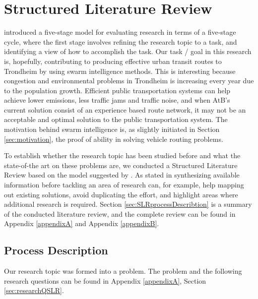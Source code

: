 \section{Structured Literature Review}
\label{sec:structuredLiteratureReview}

\citet{cohen88} introduced a five-stage model for evaluating research in terms of a five-stage cycle, where the first stage involves refining the research topic to a task, and identifying a view of how to accomplish the task. Our task / goal in this research is, hopefully, contributing to producing effective urban transit routes to Trondheim by using swarm intelligence methods. This is interesting because congestion and environmental problems in Trondheim is increasing every year due to the population growth\citep{website:miljopakken}. Efficient public transportation systems can help achieve lower emissions, less traffic jams and traffic noise, and when AtB's\citet{website:atb} current solution consist of an experience based route network, it may not be an acceptable and optimal solution to the public transportation system. The motivation behind swarm intelligence is, as slightly initiated in Section \vref{sec:motivation}, the proof of ability in solving vehicle routing problems. 

To establish whether the research topic has been studied before and what the state-of-the art on these problems are, we conducted a Structured Literature Review based on the model suggested by \citet{kofod2014}. As stated in \citep{kofod2014} synthesizing available information before tackling an area of research can, for example, help mapping out existing solutions, avoid duplicating the effort, and highlight areas where additional research is required. Section \vref{sec:SLRprocessDescribtion} is a summary of the conducted literature review, and the complete review can be found in Appendix \vref{appendixA} and Appendix \vref{appendixB}. 


\subsection{Process Description}
\label{sec:SLRprocessDescribtion}

Our research topic was formed into a problem. The problem and the following research questions can be found in Appendix \ref{appendixA}, Section \vref{sec:researchQSLR}.

